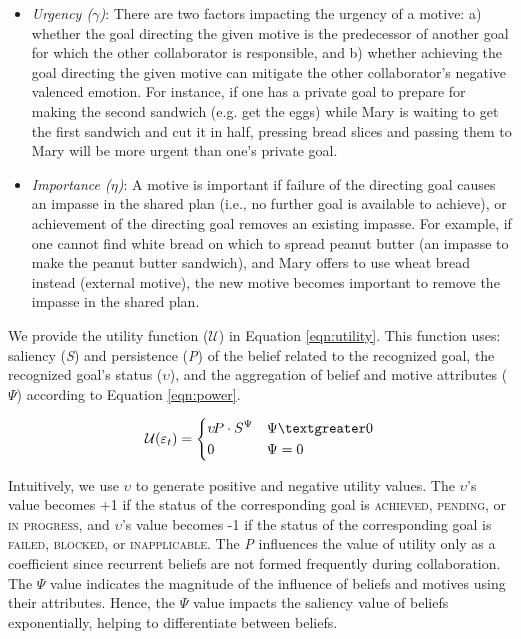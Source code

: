 \begin{itemize}[leftmargin=2pt]
  \setlength\itemsep{0.05mm}
  \item \textit{Urgency ($\gamma$)}: There are two factors impacting the urgency
  of a motive: a) whether the goal directing the given motive is the predecessor of
  another goal for which the other collaborator is responsible, and b) whether
  achieving the goal directing the given motive can mitigate the other
  collaborator's negative valenced emotion. For instance, if one has a private
  goal to prepare for making the second sandwich (e.g. get the eggs) while Mary
  is waiting to get the first sandwich and cut it in half, pressing bread slices
  and passing them to Mary will be more urgent than one's private goal.
  \item \textit{Importance ($\eta$)}: A motive is important if failure of the
  directing goal causes an impasse in the shared plan (i.e., no further goal is
  available to achieve), or achievement of the directing goal removes an
  existing impasse. For example, if one cannot find white bread on which to
  spread peanut butter (an impasse to make the peanut butter sandwich), and Mary
  offers to use wheat bread instead (external motive), the new motive becomes
  important to remove the impasse in the shared plan.
\end{itemize}

We provide the utility function ($\mathcal{U}$) in Equation \ref{eqn:utility}.
This function uses: saliency (\textit{S}) and persistence (\textit{P}) of the
belief related to the recognized goal, the recognized goal's status
($\upsilon$), and the aggregation of belief and motive attributes ($\Psi$)
according to Equation \ref{eqn:power}.

\begin{equation}
    \mathcal{U}(\varepsilon_t)= 
    \begin{dcases}
       \upsilon\!P\cdot S^{\Psi} & \Psi \textgreater 0 \\
       0               			 & \Psi = 0
    \end{dcases}
    \label{eqn:utility}
\end{equation}

Intuitively, we use $\upsilon$ to generate positive and negative utility values.
The $\upsilon$'s value becomes +1 if the status of the corresponding goal is
\textsc{achieved}, \textsc{pending}, or \textsc{in progress}, and $\upsilon$'s
value becomes -1 if the status of the corresponding goal is \textsc{failed,
blocked}, or \textsc{inapplicable}. The \textit{P} influences the value of
utility only as a coefficient since recurrent beliefs are not formed frequently
during collaboration. The $\Psi$ value indicates the magnitude of the influence
of beliefs and motives using their attributes. Hence, the $\Psi$ value impacts
the saliency value of beliefs exponentially, helping to differentiate between
beliefs.

